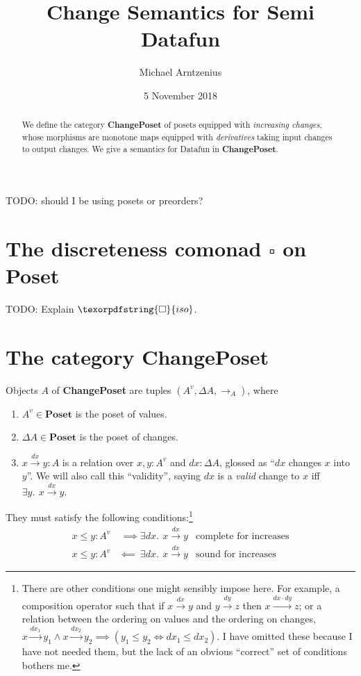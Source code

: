 \documentclass{rntz}
\title{Change Semantics for Semi\naive{} Datafun}
\author{Michael Arntzenius}
\date{5 November 2018}
\newcommand\todo[1]{{\color{Rhodamine}#1}}
\newcommand\cat\textbf
\newcommand\CP{\cat{ChangePoset}}
\newcommand\Poset{\cat{Poset}}
\newcommand\D\Delta
\newcommand\iso{\texorpdfstring{\ensuremath{\square}}{iso}}
\newcommand\validarrow{{\to}}
\newcommand\longvalidarrow{{\longrightarrow}}
\newcommand\valid[1]{\mathrel{\overset{#1}{\validarrow}}}
\newcommand\longvalid[1]{\mathrel{\overset{#1}{\longvalidarrow}}}
\newcommand\vals[1]{#1^v} %
\newcommand\chgs[1]{\D{#1}}
\newcommand\bindsp{~\,}
\newcommand\ex[1]{\exists #1.\bindsp}
\begin{document}
\maketitle

\begin{abstract}
  We define the category \CP{} of posets equipped with \emph{increasing
    changes}, whose morphisms are monotone maps equipped with \emph{derivatives}
  taking input changes to output changes. We give a semantics for Datafun in
  \CP.
\end{abstract}

\todo{TODO: should I be using posets or preorders?}


\section{The discreteness comonad \iso{} on \Poset{}}
\todo{TODO: Explain $\iso$.}


\section{The category \CP}

Objects $A$ of \CP{} are tuples $(\vals A, \chgs A, \validarrow_A)$, where
\begin{enumerate}
\item $\vals A \in \Poset$ is the poset of values.
\item $\chgs A \in \Poset$ is the poset of changes.
\item $x \valid{dx} y : A$ is a relation over $x,y : \vals A$ and $dx : \chgs
  A$, glossed as ``$dx$ changes $x$ into $y$''. We will also call this
  ``validity'', saying $dx$ is a \emph{valid} change to $x$ iff $\ex{y} x
  \valid{dx} y$.
\end{enumerate}

\noindent They must satisfy the following conditions:\footnote{There are other
  conditions one might sensibly impose here. For example, a composition operator
  such that if $x \valid{dx} y$ and $y \valid{dy} z$ then $x \longvalid{dx
    \cdot dy} z$; or a relation between the ordering on values and the ordering
  on changes, \(x \valid{dx_1} y_1 \wedge x \valid{dx_2} y_2 \implies (y_1 \le
  y_2 \iff dx_1 \le dx_2)\). I have omitted these because I have not needed
  them, but the lack of an obvious ``correct'' set of conditions bothers me.}
\begin{align*}
  x \le y : \vals A &~\implies \ex{dx} x \valid{dx} y
  & \text{complete for increases}
  \\
  x \le y : \vals A &\impliedby~ \ex{dx} x \valid{dx} y
  & \text{sound for increases}
\end{align*}
\end{document}
